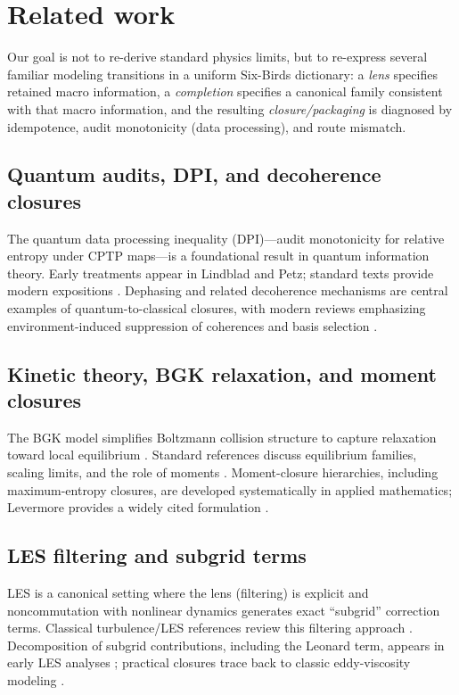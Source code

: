 \documentclass[11pt]{article}
\begin{document}
 \section{Related work}
\label{sec:related}

Our goal is not to re-derive standard physics limits, but to re-express several familiar modeling transitions in a uniform Six-Birds dictionary: a \emph{lens} specifies retained macro information, a \emph{completion} specifies a canonical family consistent with that macro information, and the resulting \emph{closure/packaging} is diagnosed by idempotence, audit monotonicity (data processing), and route mismatch.

\subsection{Quantum audits, DPI, and decoherence closures}
The quantum data processing inequality (DPI)---audit monotonicity for relative entropy under CPTP maps---is a foundational result in quantum information theory. Early treatments appear in Lindblad and Petz; standard texts provide modern expositions \citep{lindblad1975,petz1986,nielsenchuang2010,wilde2017}. Dephasing and related decoherence mechanisms are central examples of quantum-to-classical closures, with modern reviews emphasizing environment-induced suppression of coherences and basis selection \citep{zurek2003,schlosshauer2007}.

\subsection{Kinetic theory, BGK relaxation, and moment closures}
The BGK model simplifies Boltzmann collision structure to capture relaxation toward local equilibrium \citep{bhatnagar1954bgk}. Standard references discuss equilibrium families, scaling limits, and the role of moments \citep{cercignani1988}. Moment-closure hierarchies, including maximum-entropy closures, are developed systematically in applied mathematics; Levermore provides a widely cited formulation \citep{levermore1996}.

\subsection{LES filtering and subgrid terms}
LES is a canonical setting where the lens (filtering) is explicit and noncommutation with nonlinear dynamics generates exact ``subgrid'' correction terms. Classical turbulence/LES references review this filtering approach \citep{germano1992,pope2000,sagaut2006}. Decomposition of subgrid contributions, including the Leonard term, appears in early LES analyses \citep{leonard1974}; practical closures trace back to classic eddy-viscosity modeling \citep{smagorinsky1963}.
\end{document}

